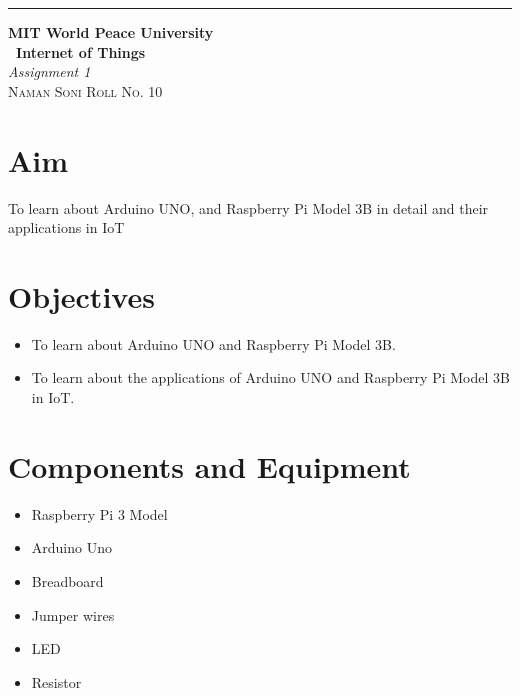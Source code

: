 \documentclass{article}
\begin{document}
\begin{titlepage} %
	
	\raggedleft\rule{1pt}{\textheight} %
	\hspace{0.05\textwidth} %
	\parbox[b]{0.75\textwidth}
	{ %
		
		{\Huge\bfseries MIT World Peace University \\[0.5\baselineskip] \ Internet of Things}\\[2\baselineskip] %
		{\large\textit{Assignment 1}}\\[4\baselineskip] %
		{\Large\textsc{Naman Soni Roll No. 10}} %
		
		\vspace{0.5\textheight} %
	}
	
\end{titlepage}
\tableofcontents
\pagebreak
\section{\textbf{Aim}}
To learn about Arduino UNO, and Raspberry Pi Model 3B in detail and their applications in IoT
\section{\textbf{Objectives}}
\begin{itemize}
	\item To learn about Arduino UNO and Raspberry Pi Model 3B.
	\item To learn about the applications of Arduino UNO and Raspberry Pi Model 3B in IoT.
\end{itemize}
\section{\textbf{Components and Equipment}}
\begin{itemize}
	\item Raspberry Pi 3 Model 
	\item Arduino Uno
	\item Breadboard
	\item Jumper wires
	\item LED
	\item Resistor
\end{itemize}
\end{document}

